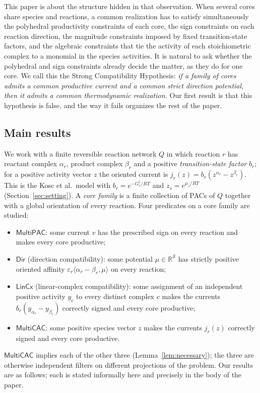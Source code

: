 \documentclass[11pt,a4paper]{article}
\theoremstyle{plain}
\theoremstyle{definition}
\theoremstyle{remark}
\newcommand{\R}{\mathbb{R}}
\newcommand{\cS}{\mathcal{S}}
\newcommand{\MPAC}{\mathsf{MultiPAC}}
\newcommand{\MCAC}{\mathsf{MultiCAC}}
\newcommand{\DIR}{\mathsf{Dir}}
\newcommand{\LIN}{\mathsf{LinCx}}
\begin{document}
This paper is about the structure hidden in that observation. When several cores share species and reactions, a common realization has to satisfy simultaneously the polyhedral productivity constraints of each core, the sign constraints on each reaction direction, the magnitude constraints imposed by fixed transition-state factors, and the algebraic constraints that tie the activity of each stoichiometric complex to a monomial in the species activities. It is natural to ask whether the polyhedral and sign constraints already decide the matter, as they do for one core. We call this the Strong Compatibility Hypothesis: \emph{if a family of cores admits a common productive current and a common strict direction potential, then it admits a common thermodynamic realization.} Our first result is that this hypothesis is false, and the way it fails organizes the rest of the paper.

\subsection{Main results}\label{sec:mainresults}

We work with a finite reversible reaction network $Q$ in which reaction $r$ has reactant complex $\alpha_r$, product complex $\beta_r$ and a positive \emph{transition-state factor} $b_r$; for a positive activity vector $z$ the oriented current is $j_r(z)=b_r(z^{\alpha_r}-z^{\beta_r})$. This is the Kosc et al.\ model with $b_r=e^{-G_r^{\ddagger}/RT}$ and $z_s=e^{\mu_s/RT}$ (Section~\ref{sec:setting}). A \emph{core family} is a finite collection of PACs of $Q$ together with a global orientation of every reaction. Four predicates on a core family are studied:
\begin{itemize}
\item $\MPAC$: some current $v$ has the prescribed sign on every reaction and makes every core productive;
\item $\DIR$ (direction compatibility): some potential $\mu\in\R^{\cS}$ has strictly positive oriented affinity $\varepsilon_r\langle\alpha_r-\beta_r,\mu\rangle$ on every reaction;
\item $\LIN$ (linear-complex compatibility): some assignment of an independent positive activity $y_c$ to every distinct complex $c$ makes the currents $b_r(y_{\alpha_r}-y_{\beta_r})$ correctly signed and every core productive;
\item $\MCAC$: some positive species vector $z$ makes the currents $j_r(z)$ correctly signed and every core productive.
\end{itemize}
$\MCAC$ implies each of the other three (Lemma~\ref{lem:necessary}); the three are otherwise independent filters on different projections of the problem. Our results are as follows; each is stated informally here and precisely in the body of the paper.
\end{document}
